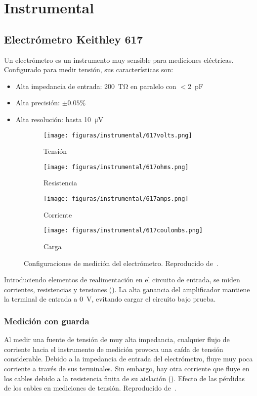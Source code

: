\section{Instrumental}
\subsection{Electrómetro Keithley 617}
Un electrómetro es un instrumento muy sensible para mediciones eléctricas.
Configurado para medir tensión, sus características son:
\begin{itemize}
    \item Alta impedancia de entrada:
\SI{200}{\tera\ohm} en paralelo con $<$\SI{2}{\pico\farad}
\item Alta precisión: $\pm0.05\%$
\item Alta resolución: hasta \SI{10}{\micro\volt}
\end{itemize}
\begin{figure}[p]
    \begin{subfigure}[b]{\textwidth}
    \centering
        \texttt{[image: figuras/instrumental/617volts.png]}
        \caption{Tensión}
    \end{subfigure}
    \begin{subfigure}[b]{\textwidth}
    \centering
        \texttt{[image: figuras/instrumental/617ohms.png]}
        \caption{Resistencia}
    \end{subfigure}
    \begin{subfigure}[b]{\textwidth}
    \centering
        \texttt{[image: figuras/instrumental/617amps.png]}
        \caption{Corriente}
    \end{subfigure}
    \begin{subfigure}[b]{\textwidth}
    \centering
        \texttt{[image: figuras/instrumental/617coulombs.png]}
        \caption{Carga}
    \end{subfigure}
    \caption{Configuraciones de medición del electrómetro.
    Reproducido de~\cite{keithley_instruments_inc._keithley_1984}.}
    \label{fig:keithley617}
\end{figure}
Introduciendo elementos de realimentación en el circuito de entrada,
se miden corrientes, resistencias y tensiones 
().
La alta ganancia del amplificador mantiene la terminal de entrada a
\SI{0}{\volt}, 
evitando cargar el circuito bajo prueba.
\subsubsection{Medición con guarda}
Al medir una fuente de tensión de muy alta impedancia,
cualquier flujo de corriente hacia el instrumento de medición
provoca una caída de tensión considerable.
Debido a la impedancia de entrada del electrómetro,
fluye muy poca corriente a través de sus terminales.
Sin embargo, hay otra corriente que fluye en los cables debido a la resistencia
finita de su aislación ().
{Efecto de las pérdidas de los cables en mediciones de tensión.
    Reproducido de~\cite{keithley_instruments_inc._keithley_1984}.}

